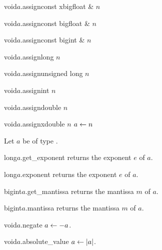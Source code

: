 \begin{fcode}{void}{$a$.assign}{const xbigfloat & $n$}\end{fcode}
\begin{fcode}{void}{$a$.assign}{const bigfloat & $n$}\end{fcode}
\begin{fcode}{void}{$a$.assign}{const bigint & $n$}\end{fcode}
\begin{fcode}{void}{$a$.assign}{long $n$}\end{fcode}
\begin{fcode}{void}{$a$.assign}{unsigned long $n$}\end{fcode}
\begin{fcode}{void}{$a$.assign}{int $n$}\end{fcode}
\begin{fcode}{void}{$a$.assign}{double $n$}\end{fcode}
\begin{fcode}{void}{$a$.assign}{xdouble $n$}
  $a \leftarrow n$
\end{fcode}



\ACCS

Let $a$ be of type .

\begin{cfcode}{long}{$a$.get_exponent}{}
  returns the exponent $e$ of $a$.
\end{cfcode}

\begin{cfcode}{long}{$a$.exponent}{}
  returns the exponent $e$ of $a$.
\end{cfcode}

\begin{cfcode}{bigint}{$a$.get_mantissa}{}
  returns the mantissa $m$ of $a$.
\end{cfcode}

\begin{cfcode}{bigint}{$a$.mantissa}{}
  returns the mantissa $m$ of $a$.
\end{cfcode}



\MODF

\begin{fcode}{void}{$a$.negate}{}
  $a \leftarrow -a$.
\end{fcode}

\begin{fcode}{void}{$a$.absolute_value}{}
  $a \leftarrow |a|$.
\end{fcode}

